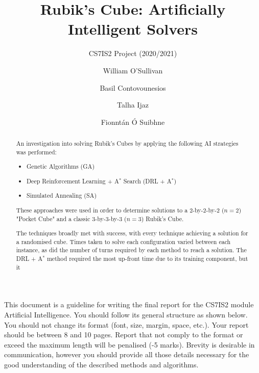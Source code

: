 \documentclass[UKenglish]{svproc}
\title{Rubik's Cube: Artificially Intelligent Solvers}
\subtitle{CS7IS2 Project (2020/2021)}
\author{
  William O'Sullivan   \and
  Basil Contovounesios \and
  Talha Ijaz           \and
  Fionnt\'an \'O Suibhne}
\institute{\email{
    wosulliv@tcd.ie,
    contovob@tcd.ie,
    ijazm@tcd.ie,
    suibhnef@tcd.ie}}
\begin{document}
\mainmatter
\maketitle              %

\begin{abstract}

An investigation into solving Rubik's Cubes by applying the following AI strategies was performed:
\begin{itemize}
    \item Genetic Algorithms (GA)
    \item Deep Reinforcement Learning + A$^{\ast}$ Search (DRL + A$^{\ast}$)
    \item Simulated Annealing (SA)
\end{itemize}
These approaches were used in order to determine solutions to a 2-by-2-by-2 ($n=2$) "Pocket Cube" and a classic 3-by-3-by-3 ($n=3$) Rubik's Cube.

The techniques broadly met with success, with every technique achieving a solution for a randomised cube. Times taken to solve each configuration varied between each instance, as did the number of turns required by each method to reach a solution. The DRL + A$^{\ast}$ method required the most up-front time due to its training component, but it 




\end{abstract}
%
\iffalse
This document is a guideline for writing the final report for the CS7IS2 module Artificial Intelligence. You should follow its general structure as shown below.
You should not change its format (font, size, margin, space, etc.). 
Your report should be between 8 and 10 pages. Report that not comply to the format or exceed the maximum length will be penalised (-5 marks).
Brevity is desirable in communication, however you should provide all those details necessary for the good understanding of the described methods and algorithms. 
\end{document}
